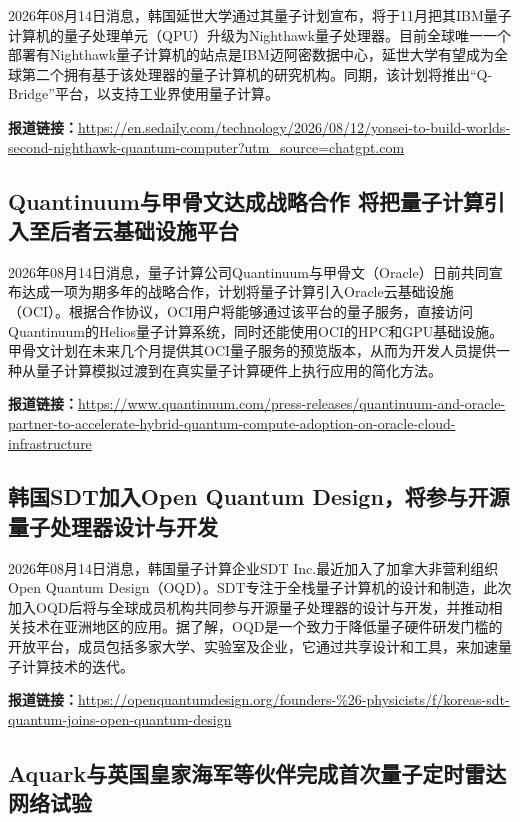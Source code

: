 \documentclass[12pt,a4paper]{ctexart}
\begin{document}
2026年08月14日消息，韩国延世大学通过其量子计划宣布，将于11月把其IBM量子计算机的量子处理单元（QPU）升级为Nighthawk量子处理器。目前全球唯一一个部署有Nighthawk量子计算机的站点是IBM迈阿密数据中心，延世大学有望成为全球第二个拥有基于该处理器的量子计算机的研究机构。同期，该计划将推出“Q-Bridge”平台，以支持工业界使用量子计算。

\noindent\textbf{报道链接：}\url{https://en.sedaily.com/technology/2026/08/12/yonsei-to-build-worlds-second-nighthawk-quantum-computer?utm\_source=chatgpt.com}

\subsection{ Quantinuum与甲骨文达成战略合作 将把量子计算引入至后者云基础设施平台 }

2026年08月14日消息，量子计算公司Quantinuum与甲骨文（Oracle）日前共同宣布达成一项为期多年的战略合作，计划将量子计算引入Oracle云基础设施（OCI）。根据合作协议，OCI用户将能够通过该平台的量子服务，直接访问Quantinuum的Helios量子计算系统，同时还能使用OCI的HPC和GPU基础设施。甲骨文计划在未来几个月提供其OCI量子服务的预览版本，从而为开发人员提供一种从量子计算模拟过渡到在真实量子计算硬件上执行应用的简化方法。

\noindent\textbf{报道链接：}\url{https://www.quantinuum.com/press-releases/quantinuum-and-oracle-partner-to-accelerate-hybrid-quantum-compute-adoption-on-oracle-cloud-infrastructure}

\subsection{ 韩国SDT加入Open Quantum Design，将参与开源量子处理器设计与开发 }

2026年08月14日消息，韩国量子计算企业SDT Inc.最近加入了加拿大非营利组织Open Quantum Design（OQD）。SDT专注于全栈量子计算机的设计和制造，此次加入OQD后将与全球成员机构共同参与开源量子处理器的设计与开发，并推动相关技术在亚洲地区的应用。据了解，OQD是一个致力于降低量子硬件研发门槛的开放平台，成员包括多家大学、实验室及企业，它通过共享设计和工具，来加速量子计算技术的迭代。

\noindent\textbf{报道链接：}\url{https://openquantumdesign.org/founders-\%26-physicists/f/koreas-sdt-quantum-joins-open-quantum-design}

\subsection{ Aquark与英国皇家海军等伙伴完成首次量子定时雷达网络试验 }
\end{document}
